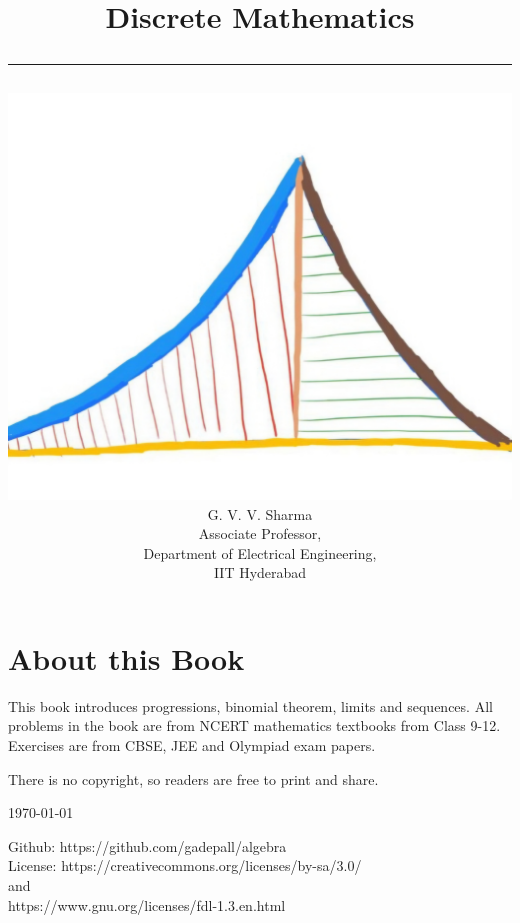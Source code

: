 \documentclass[journal]{IEEEtran}
\begin{document}

\onecolumn


\title{
	\begin{center}
	Discrete Mathematics
	\\
\rule{0.4\columnwidth}{0.4pt}
\end{center}
}
\author{
\vspace{11cm}
	\begin{center}
\includegraphics[width=0.2\columnwidth]{figs/logo.jpg}
\\
		{\huge	G. V. V. Sharma}\\Associate Professor,\\Department of Electrical Engineering, \\ IIT Hyderabad
	\end{center}
}
\maketitle

\newpage
\section*{About this Book}

This book introduces progressions, binomial theorem, limits and sequences. 
 All problems in the book are from NCERT mathematics textbooks from Class 9-12.  Exercises are from CBSE, JEE and Olympiad exam papers.   

There is no copyright, so readers are free to print and share.  

\begin{flushright}
\today
\end{flushright}
Github: https://github.com/gadepall/algebra
		\\
License: https://creativecommons.org/licenses/by-sa/3.0/
\\
and
\\
https://www.gnu.org/licenses/fdl-1.3.en.html
\end{document}
